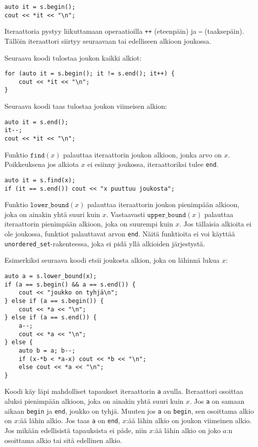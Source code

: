 \begin{lstlisting}
auto it = s.begin();
cout << *it << "\n";
\end{lstlisting}

Iteraattoria pystyy liikuttamaan
operaatioilla \texttt{++} (eteenpäin)
ja \texttt{---} (taaksepäin).
Tällöin iteraattori siirtyy seuraavaan
tai edelliseen alkioon joukossa.

Seuraava koodi tulostaa joukon kaikki alkiot:

\begin{lstlisting}
for (auto it = s.begin(); it != s.end(); it++) {
    cout << *it << "\n";
}
\end{lstlisting}
Seuraava koodi taas tulostaa joukon
viimeisen alkion:

\begin{lstlisting}
auto it = s.end();
it--;
cout << *it << "\n";
\end{lstlisting}

Funktio $\texttt{find}(x)$ palauttaa iteraattorin
joukon alkioon, jonka arvo on $x$.
Poikkeuksena jos alkiota $x$ ei esiinny joukossa,
iteraattoriksi tulee \texttt{end}.

\begin{lstlisting}
auto it = s.find(x);
if (it == s.end()) cout << "x puuttuu joukosta";
\end{lstlisting}

Funktio $\texttt{lower\_bound}(x)$ palauttaa
iteraattorin joukon pienimpään alkioon,
joka on ainakin yhtä suuri kuin $x$.
Vastaavasti $\texttt{upper\_bound}(x)$ palauttaa
iteraattorin pienimpään alkioon,
joka on suurempi kuin $x$.
Jos tällaisia alkioita ei ole joukossa,
funktiot palauttavat arvon \texttt{end}.
Näitä funktioita ei voi käyttää
\texttt{unordered\_set}-rakenteessa,
joka ei pidä yllä alkioiden järjestystä.

\begin{samepage}
Esimerkiksi seuraava koodi etsii joukosta
alkion, joka on lähinnä lukua $x$:

\begin{lstlisting}
auto a = s.lower_bound(x);
if (a == s.begin() && a == s.end()) {
    cout << "joukko on tyhjä\n";
} else if (a == s.begin()) {
    cout << *a << "\n";
} else if (a == s.end()) {
    a--;
    cout << *a << "\n";
} else {
    auto b = a; b--;
    if (x-*b < *a-x) cout << *b << "\n";
    else cout << *a << "\n";
}
\end{lstlisting}

Koodi käy läpi mahdolliset tapaukset
iteraattorin \texttt{a} avulla.
Iteraattori
osoittaa aluksi pienimpään alkioon,
joka on ainakin yhtä suuri kuin $x$.
Jos \texttt{a} on samaan aikaan \texttt{begin}
ja \texttt{end}, joukko on tyhjä.
Muuten jos \texttt{a} on \texttt{begin},
sen osoittama alkio on $x$:ää lähin alkio.
Jos taas \texttt{a} on \texttt{end},
$x$:ää lähin alkio on joukon viimeinen alkio.
Jos mikään edellisistä tapauksista ei päde,
niin $x$:ää lähin alkio
on joko $a$:n osoittama alkio tai sitä edellinen alkio.
\end{samepage}

